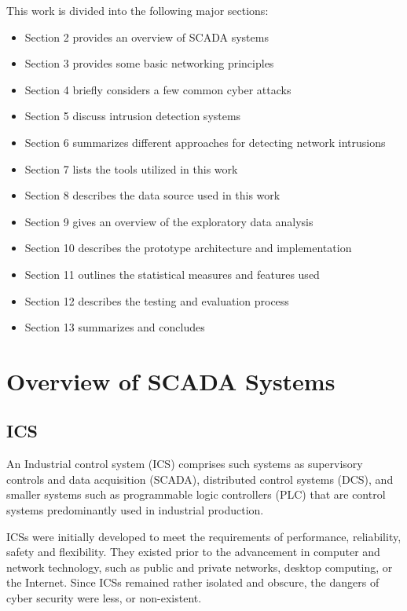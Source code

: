 \documentclass[12pt,]{article}
\begin{document}
This work is divided into the following major sections:

\begin{itemize}
\itemsep1pt\parskip0pt
\item
  Section 2 provides an overview of SCADA systems
\item
  Section 3 provides some basic networking principles
\item
  Section 4 briefly considers a few common cyber attacks
\item
  Section 5 discuss intrusion detection systems
\item
  Section 6 summarizes different approaches for detecting network
  intrusions
\item
  Section 7 lists the tools utilized in this work
\item
  Section 8 describes the data source used in this work
\item
  Section 9 gives an overview of the exploratory data analysis
\item
  Section 10 describes the prototype architecture and implementation
\item
  Section 11 outlines the statistical measures and features used
\item
  Section 12 describes the testing and evaluation process
\item
  Section 13 summarizes and concludes
\end{itemize}

\pagebreak

\section{Overview of SCADA Systems}\label{overview-of-scada-systems}

\subsection{ICS}\label{ics}

An Industrial control system (ICS) comprises such systems as supervisory
controls and data acquisition (SCADA), distributed control systems
(DCS), and smaller systems such as programmable logic controllers (PLC)
that are control systems predominantly used in industrial production.

ICSs were initially developed to meet the requirements of performance,
reliability, safety and flexibility. They existed prior to the
advancement in computer and network technology, such as public and
private networks, desktop computing, or the Internet. Since ICSs
remained rather isolated and obscure, the dangers of cyber security were
less, or non-existent.
\end{document}

